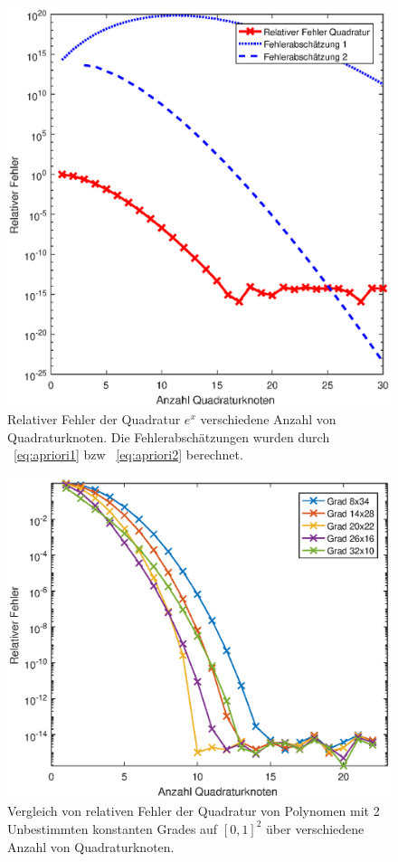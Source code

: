 \documentclass[french, 12pt, a4paper, onesided]{scrartcl}
\theoremstyle{plain}
\theoremstyle{definition}
\theoremstyle{remark}
\begin{document}
\begin{figure}[h]
	\centering
	\includegraphics[width=0.9\linewidth]{Rel-Fehler-Exp.eps}
	\caption{Relativer Fehler der Quadratur $e^x$ verschiedene Anzahl von Quadraturknoten. Die Fehlerabschätzungen wurden durch ~\eqref{eq:apriori1} bzw ~\eqref{eq:apriori2} berechnet.}
	\label{fig:relError1DExp}
\end{figure}

\begin{figure}[h]
	\centering
	\includegraphics[width=0.9\linewidth]{Rel-Fehler-R.eps}
	\caption{Vergleich von relativen Fehler der Quadratur von Polynomen mit 2 Unbestimmten konstanten Grades auf $[0,1]^2$ über verschiedene Anzahl von Quadraturknoten.}
	\label{fig:relErrorR}
\end{figure}
\end{document}
